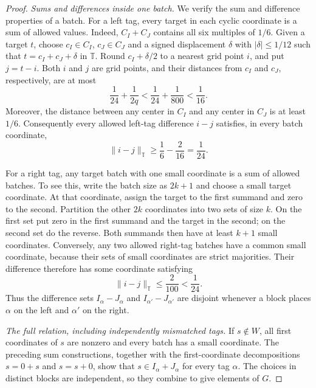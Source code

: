 \begin{proof}
\emph{Sums and differences inside one batch.}
We verify the sum and difference properties of a batch.  For a left tag,
every target in each cyclic coordinate is a sum of allowed values.  Indeed,
$C_I+C_J$ contains all six multiples of $1/6$.  Given a target $t$, choose
$c_I\in C_I$, $c_J\in C_J$ and a signed displacement $\delta$ with
$|\delta|\leq 1/12$ such that
$t=c_I+c_J+\delta$ in $\mathbb T$.  Round
$c_I+\delta/2$ to a nearest grid point $i$, and put $j=t-i$.  Both $i$ and
$j$ are grid points, and their distances from $c_I$ and $c_J$, respectively,
are at most
\[
 \frac1{24}+\frac1{2q}
 <\frac1{24}+\frac1{800}<\frac1{16}.
\]
Moreover, the distance between any center in $C_I$ and any center in $C_J$
is at least $1/6$.  Consequently every allowed left-tag difference $i-j$
satisfies, in every batch coordinate,
\[
 \|i-j\|_{\mathbb T}\geq
 \frac16-\frac2{16}=\frac1{24}.
\]

For a right tag, any target batch with one small coordinate is a sum of
allowed batches.  To see this, write the batch size as $2k+1$ and choose a
small target coordinate.  At that coordinate, assign the target to the
first summand and zero to the second.  Partition the other $2k$ coordinates
into two sets of size $k$.  On the first set put zero in the first summand
and the target in the second; on the second set do the reverse.  Both
summands then have at least $k+1$ small coordinates.  Conversely, any two
allowed right-tag batches have a common small coordinate, because their
sets of small coordinates are strict majorities.  Their difference
therefore has some coordinate satisfying
\[
 \|i-j\|_{\mathbb T}\leq\frac2{100}<\frac1{24}.
\]
Thus the difference sets $I_\alpha-J_\alpha$ and
$I_{\alpha'}-J_{\alpha'}$ are disjoint whenever a block places $\alpha$
on the left and $\alpha'$ on the right.

\emph{The full relation, including independently mismatched tags.}
If $s\notin W$, all first coordinates of $s$ are nonzero and every batch
has a small coordinate.  The preceding sum constructions, together with
the first-coordinate decompositions $s=0+s$ and $s=s+0$, show that
$s\in I_\alpha+J_\alpha$ for every tag $\alpha$.  The choices in distinct
blocks are independent, so they combine to give elements of $G$.


\end{proof}
